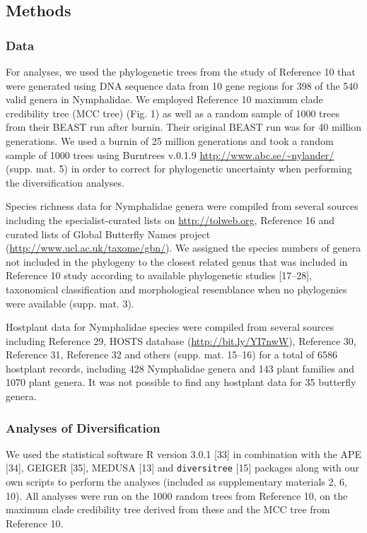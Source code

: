 \documentclass[]{article}
\begin{document}
\subsection{Methods}\label{methods}

\subsubsection{Data}\label{data}

For analyses, we used the phylogenetic trees from the study of Reference
10 that were generated using DNA sequence data from 10 gene regions for
398 of the 540 valid genera in Nymphalidae. We employed Reference 10
maximum clade credibility tree (MCC tree) (Fig. 1) as well as a random
sample of 1000 trees from their BEAST run after burnin. Their original
BEAST run was for 40 million generations. We used a burnin of 25 million
generations and took a random sample of 1000 trees using Burntrees
v.0.1.9 \url{http://www.abc.se/~nylander/} (supp. mat. 5) in order to
correct for phylogenetic uncertainty when performing the diversification
analyses.

Species richness data for Nymphalidae genera were compiled from several
sources including the specialist-curated lists on
\url{http://tolweb.org}, Reference 16 and curated lists of Global
Butterfly Names project (\url{http://www.ucl.ac.uk/taxome/gbn/}). We
assigned the species numbers of genera not included in the phylogeny to
the closest related genus that was included in Reference 10 study
according to available phylogenetic studies {[}17--28{]}, taxonomical
classification and morphological resemblance when no phylogenies were
available (supp. mat. 3).

Hostplant data for Nymphalidae species were compiled from several
sources including Reference 29, HOSTS database
(\url{http://bit.ly/YI7nwW}), Reference 30, Reference 31, Reference 32
and others (supp. mat. 15--16) for a total of 6586 hostplant records,
including 428 Nymphalidae genera and 143 plant families and 1070 plant
genera. It was not possible to find any hostplant data for 35 butterfly
genera.

\subsubsection{Analyses of
Diversification}\label{analyses-of-diversification}

We used the statistical software R version 3.0.1 {[}33{]} in combination
with the APE {[}34{]}, GEIGER {[}35{]}, MEDUSA {[}13{]} and
\texttt{diversitree} {[}15{]} packages along with our own scripts to
perform the analyses (included as supplementary materials 2, 6, 10). All
analyses were run on the 1000 random trees from Reference 10, on the
maximum clade credibility tree derived from these and the MCC tree from
Reference 10.
\end{document}
